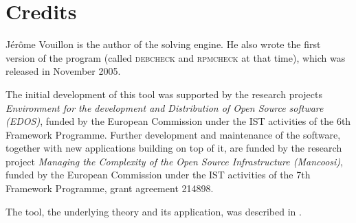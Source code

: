 
\section{Credits}
\label{sec:credits}

Jérôme Vouillon is the author of the solving engine. He also wrote the
first version of the program (called \textsc{debcheck} and
\textsc{rpmcheck} at that time), which was released in November 2005.

The initial development of this tool was supported by the research
projects \emph{Environment for the development and Distribution of
  Open Source software (EDOS)}, funded by the European Commission
under the IST activities of the 6th Framework Programme. Further
development and maintenance of the software, together with new
applications building on top of it, are funded by the research project
\emph{Managing the Complexity of the Open Source Infrastructure
  (Mancoosi)}, funded by the European Commission under the IST
activities of the 7th Framework Programme, grant agreement 214898.

The tool, the underlying theory and its application, was described in
\cite{edos2006ase}.

